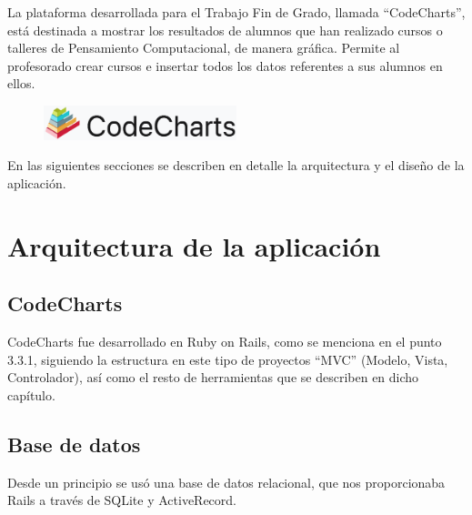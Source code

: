 
La plataforma desarrollada para el Trabajo Fin de Grado, llamada ``CodeCharts'', está destinada a mostrar los resultados de alumnos que han realizado cursos o talleres de Pensamiento Computacional, de manera gráfica.
Permite al profesorado crear cursos e insertar todos los datos referentes a sus alumnos en ellos.

\begin{figure}[!th]
\begin{center}
\includegraphics[width=0.5\textwidth]{images/logo_plataforma.eps}
\label{fig:9}
\end{center}
\end{figure}

En las siguientes secciones se describen en detalle la arquitectura y el diseño de la aplicación.


\section{Arquitectura de la aplicación}
\label{4:sec:1}

\subsection{CodeCharts}
\label{1:sec:1}

CodeCharts fue desarrollado en Ruby on Rails, como se menciona en el punto 3.3.1, siguiendo la estructura en este tipo de proyectos ``MVC'' (Modelo, Vista, Controlador), así como el resto de herramientas que se describen en dicho capítulo.


\newpage
\subsection{Base de datos}
\label{1:sec:2}

Desde un principio se usó una base de datos relacional, que nos proporcionaba Rails a través de SQLite y ActiveRecord.

